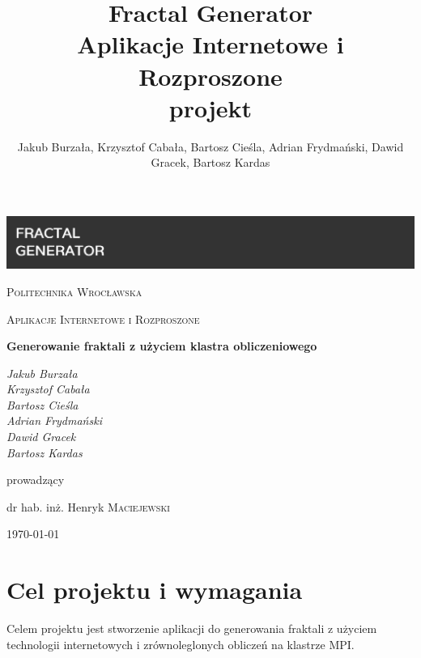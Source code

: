\documentclass[a4paper]{article}
\title{\textbf{Fractal Generator} \\ Aplikacje Internetowe i Rozproszone \\ projekt}
\author{Jakub Burzała, Krzysztof Cabała, Bartosz Cieśla, Adrian Frydmański, Dawid Gracek, Bartosz Kardas}
\begin{document}
\begin{titlepage}
	\centering
	\includegraphics[width=\textwidth]{banner2.png}\par\vspace{1cm}
	{\scshape\LARGE Politechnika Wrocławska \par}
	\vspace{1cm}
	{\scshape\Large Aplikacje Internetowe i Rozproszone\par}
	\vspace{1.5cm}
	{\huge\bfseries Generowanie fraktali z użyciem klastra obliczeniowego \par}
	\vspace{2cm}
	{\Large\itshape Jakub Burzała \\ Krzysztof Cabała \\ Bartosz Cieśla \\ Adrian Frydmański \\ Dawid Gracek \\ Bartosz Kardas \par}
	\vfill
	prowadzący\par
	dr hab. inż. Henryk \textsc{Maciejewski}

	\vfill

	{\large \today\par}
\end{titlepage}

\newpage
\clearpage
\tableofcontents
\newpage

\section{Cel projektu i wymagania}
Celem projektu jest stworzenie aplikacji do generowania fraktali z użyciem technologii internetowych i zrównoleglonych obliczeń na klastrze MPI.
\end{document}
